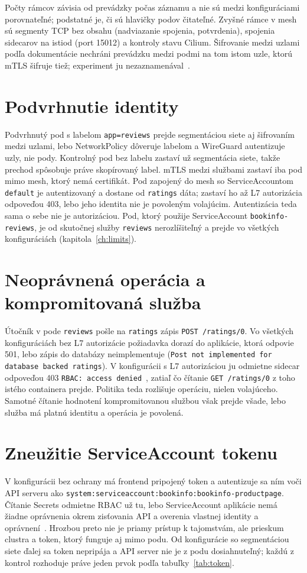 Počty rámcov závisia od prevádzky počas záznamu a nie sú medzi konfiguráciami porovnateľné; podstatné je, či sú hlavičky podov čitateľné. Zvyšné rámce v mesh sú segmenty TCP bez obsahu (nadviazanie spojenia, potvrdenia), spojenia sidecarov na istiod (port 15012) a kontroly stavu Cilium. Šifrovanie medzi uzlami podľa dokumentácie nechráni prevádzku medzi podmi na tom istom uzle, ktorú mTLS šifruje tiež; experiment ju nezaznamenával~\cite{cilium-wireguard,istio-security}.

\section{Podvrhnutie identity}

Podvrhnutý pod s labelom \texttt{app=reviews} prejde segmentáciou siete aj šifrovaním medzi uzlami, lebo NetworkPolicy dôveruje labelom a WireGuard autentizuje uzly, nie pody. Kontrolný pod bez labelu zastaví už segmentácia siete, takže prechod spôsobuje práve skopírovaný label. mTLS medzi službami zastaví iba pod mimo mesh, ktorý nemá certifikát. Pod zapojený do mesh so ServiceAccountom \texttt{default} je autentizovaný a dostane od \texttt{ratings} dáta; zastaví ho až L7 autorizácia odpoveďou 403, lebo jeho identita nie je povoleným volajúcim. Autentizácia teda sama o sebe nie je autorizáciou. Pod, ktorý použije ServiceAccount \texttt{bookinfo-reviews}, je od skutočnej služby \texttt{reviews} nerozlíšiteľný a prejde vo všetkých konfiguráciách (kapitola~\ref{ch:limits}).

\section{Neoprávnená operácia a kompromitovaná služba}

Útočník v pode \texttt{reviews} pošle na \texttt{ratings} zápis \texttt{POST /ratings/0}. Vo všetkých konfiguráciách bez L7 autorizácie požiadavka dorazí do aplikácie, ktorá odpovie 501, lebo zápis do databázy neimplementuje (\texttt{Post not implemented for database backed ratings}). V konfigurácii s L7 autorizáciou ju odmietne sidecar odpoveďou 403 \texttt{RBAC: access denied}~\cite{istio-authorizationpolicy}, zatiaľ čo čítanie \texttt{GET /ratings/0} z toho istého containera prejde. Politika teda rozlišuje operáciu, nielen volajúceho. Samotné čítanie hodnotení kompromitovanou službou však prejde všade, lebo služba má platnú identitu a operácia je povolená.

\section{Zneužitie ServiceAccount tokenu}

V konfigurácii bez ochrany má frontend pripojený token a autentizuje sa ním voči API serveru ako \texttt{system:serviceaccount:bookinfo:bookinfo-productpage}. Čítanie Secrets odmietne RBAC už tu, lebo ServiceAccount aplikácie nemá žiadne oprávnenia okrem zisťovania API a overenia vlastnej identity a oprávnení~\cite{k8s-rbac}. Hrozbou preto nie je priamy prístup k tajomstvám, ale prieskum clustra a token, ktorý funguje aj mimo podu. Od konfigurácie so segmentáciou siete ďalej sa token nepripája a API server nie je z podu dosiahnuteľný; každú z kontrol rozhoduje práve jeden prvok podľa tabuľky~\ref{tab:token}.
